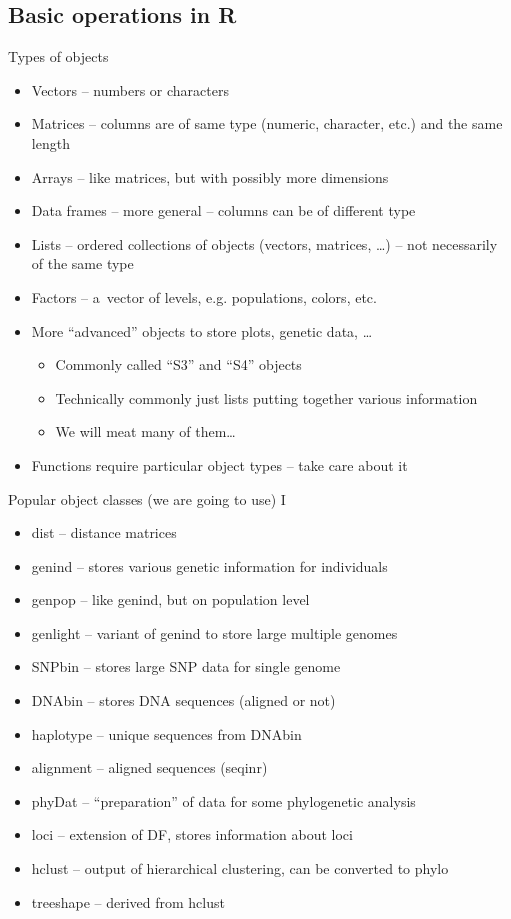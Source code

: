 \documentclass[compress, ucs, xelatex, 11pt, xcolor=svgnames,
  hyperref={
    bookmarks=true,
    unicode=true,
    colorlinks=true,
    pdftitle={Molecular data in R},
    plainpages=false,
    pdfauthor={Vojtech Zeisek},
    pdfsubject={Course about phylogeny and evolution in R},
    pdfcreator={XeLaTeX},
    pdfkeywords={R, evolution, phylogeny, molecular data},
    linkcolor=Tomato,
    anchorcolor=SaddleBrown,
    citecolor=Goldenrod,
    filecolor=DarkMagenta,
    menucolor=Sienna,
    urlcolor=DarkTurquoise,
    pdftex},
  url={hyphens, lowtilde} %
  ]{beamer}
\begin{document}
\subsection{Basic operations in R}

\begin{frame}{Types of objects}
\begin{itemize}
 \item Vectors -- numbers or characters
 \item Matrices -- columns are of same type (numeric, character, etc.) and the same length
 \item Arrays -- like matrices, but with possibly more dimensions
 \item Data frames -- more general -- columns can be of different type
 \item Lists -- ordered collections of objects (vectors, matrices, \ldots) -- not necessarily of the same type
 \item Factors -- a~vector of levels, e.g. populations, colors, etc.
 \item More ``advanced'' objects to store plots, genetic data, \ldots
 \begin{itemize}
  \item Commonly called ``S3'' and ``S4'' objects
  \item Technically commonly just lists putting together various information
  \item We will meat many of them\ldots
 \end{itemize}
 \item Functions require particular object types -- take care about it
\end{itemize}
\end{frame}

\begin{frame}{Popular object classes (we are going to use) I}
\begin{itemize}
 \item dist -- distance matrices
 \item genind -- stores various genetic information for individuals
 \item genpop -- like genind, but on population level
 \item genlight -- variant of genind to store large multiple genomes
 \item SNPbin -- stores large SNP data for single genome
 \item DNAbin -- stores DNA sequences (aligned or not)
 \item haplotype -- unique sequences from DNAbin
 \item alignment -- aligned sequences (seqinr)
 \item phyDat -- ``preparation'' of data for some phylogenetic analysis
 \item loci -- extension of DF, stores information about loci
 \item hclust -- output of hierarchical clustering, can be converted to phylo
 \item treeshape -- derived from hclust
\end{itemize}
\end{frame}
\end{document}
